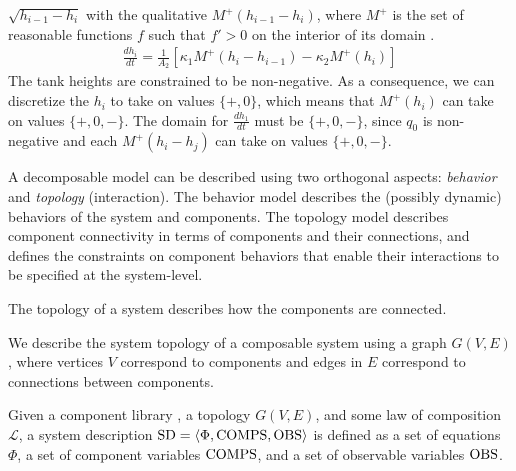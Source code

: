 $\sqrt{h_{i - 1} - h_i}$ with the qualitative $M^+(h_{i - 1} - h_i)$,
where $M^+$ is the set of reasonable functions $f$ such that $f' > 0$
on the interior of its domain
\citep{kuipers1994composition}.
%
\begin{eqnarray}
%
\frac{d h_i}{dt} = \frac{1}{A_2}\left[\kappa_{1} M^+(h_{i} - h_{i - 1}) - \kappa_2 M^+(h_i)\right]
%
\end{eqnarray}
%
The tank heights are constrained to be non-negative. As a consequence,
we can discretize the $h_i$ to take on values $\{+, 0\}$, which means
that $M^+(h_i)$ can take on values $\{+, 0, -\}$.  The domain for
$\frac{d h_1}{dt}$ must be $\{+, 0, -\}$, since $q_0$ is non-negative
and each $M^+(h_i - h_j)$ can take on values $\{+, 0, -\}$.
\par
A decomposable model can be described using two orthogonal aspects:
\textit{behavior} and \textit{topology} (interaction). The behavior
model describes the (possibly dynamic) behaviors of the system and
components. The topology model describes component connectivity in
terms of components and their connections, and defines the constraints
on component behaviors that enable their interactions to be specified
at the system-level.
\par
The topology of a system describes how the components are connected.
%
\begin{definition}[Topology]
%
We describe the system topology of a composable system using a graph
$G(V, E)$, where vertices $V$ correspond to components and edges in
$E$ correspond to connections between components.
%
\end{definition}
%
\begin{definition}
%
Given a component library \cl, a topology $G(V, E)$, and some law of
composition $\mathcal{L}$, a system description $\mathrm{SD} = \langle\Phi,
\mathrm{COMPS}, \mathrm{OBS}\rangle$ is defined as a set of
equations $\Phi$, a set of component variables $\mathrm{COMPS}$, and a set of
observable variables $\mathrm{OBS}$.
%
\end{definition}
%
%
%
%
%


